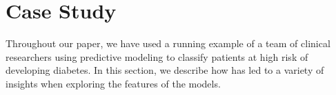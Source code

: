
\section{Case Study}
Throughout our paper, we have used a running example of a team
of clinical researchers using predictive modeling to
classify patients at high risk of developing diabetes.
In this section, we describe how \infuse has led to a variety
of insights when exploring the features of the models.

\begin{figure}[ht]
\centering
{}
\end{figure}
